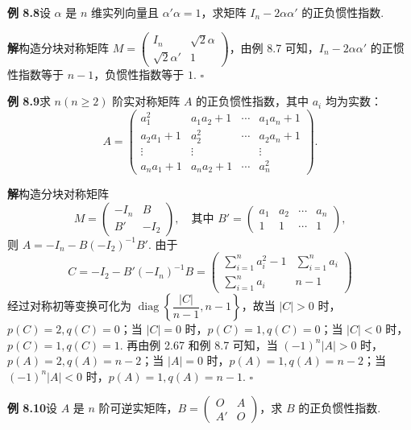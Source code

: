 \documentclass[UTF8,12pt,a4paper,fontset=fandol]{ctexart}
\begin{document}
\noindent\textbf{例 8.8}\quad 设 $\alpha$ 是 $n$ 维实列向量且 $\alpha'\alpha=1$，求矩阵 $I_n-2\alpha\alpha'$ 的正负惯性指数.

\noindent\textbf{解}\quad 构造分块对称矩阵 $M=\left(\begin{array}{cc}I_n&\sqrt{2}\alpha\\ \sqrt{2}\alpha'&1\end{array}\right)$，由例 8.7 可知，$I_n-2\alpha\alpha'$ 的正惯性指数等于 $n-1$，负惯性指数等于 $1$. $\ensuremath{\square}$

\noindent\textbf{例 8.9}\quad 求 $n(n\ge 2)$ 阶实对称矩阵 $A$ 的正负惯性指数，其中 $a_i$ 均为实数：
\[
A=\left(\begin{array}{cccc}
a_1^2 & a_1a_2+1 & \cdots & a_1a_n+1\\
a_2a_1+1 & a_2^2 & \cdots & a_2a_n+1\\
\vdots & \vdots &        & \vdots\\
a_na_1+1 & a_na_2+1 & \cdots & a_n^2
\end{array}\right).
\]

\noindent\textbf{解}\quad 构造分块对称矩阵
\[
M=\left(\begin{array}{cc}
-I_n & B\\
B' & -I_2
\end{array}\right),\quad
\text{其中 }B'=\left(\begin{array}{cccc}
a_1 & a_2 & \cdots & a_n\\
1 & 1 & \cdots & 1
\end{array}\right),
\]
则 $A=-I_n-B(-I_2)^{-1}B'$. 由于
\[
C=-I_2-B'(-I_n)^{-1}B=
\left(\begin{array}{cc}
\sum_{i=1}^n a_i^2-1 & \sum_{i=1}^n a_i\\
\sum_{i=1}^n a_i & n-1
\end{array}\right)
\]
经过对称初等变换可化为 $\operatorname{diag}\left\{\dfrac{|C|}{n-1},n-1\right\}$，故当 $|C|>0$ 时，$p(C)=2,q(C)=0$；当 $|C|=0$ 时，$p(C)=1,q(C)=0$；当 $|C|<0$ 时，$p(C)=1,q(C)=1$. 再由例 2.67 和例 8.7 可知，当 $(-1)^n|A|>0$ 时，$p(A)=2,q(A)=n-2$；当 $|A|=0$ 时，$p(A)=1,q(A)=n-2$；当 $(-1)^n|A|<0$ 时，$p(A)=1,q(A)=n-1$. $\ensuremath{\square}$

\noindent\textbf{例 8.10}\quad 设 $A$ 是 $n$ 阶可逆实矩阵，$B=\left(\begin{array}{cc}O&A\\ A'&O\end{array}\right)$，求 $B$ 的正负惯性指数.
\end{document}
